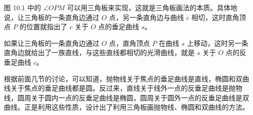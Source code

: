 \begin{minipage}[t]{0.44\textwidth}
  \par\vspace{4pt}{\footnotesize 图\ 10.1}
\end{minipage}

图 10.1 中的 $\angle OPM$ 可以用三角板来实现，这就是三角板画法的本质。具体地说，让三角板的一条直角边通过 $O$ 点，另一条直角边与曲线 $c$ 相切，这时直角顶点 $P$ 的位置就指出了 $c$ 关于 $O$ 点的垂足曲线 $s$。

如果让三角板的一条直角边通过 $O$ 点，直角顶点 $P$ 在曲线 $s$ 上移动，这时另一条直角边就给出了一族直线，与这些直线都相切的光滑曲线，就是 $s$ 关于 $O$ 点的反垂足曲线 $c$。

根据前面几节的讨论，可以知道，抛物线关于焦点的垂足曲线是直线，椭圆和双曲线关于焦点的垂足曲线都是圆。反过来，直线关于线外一点的反垂足曲线是抛物线，圆周关于圆内一点的反垂足曲线是椭圆，圆周关于圆外一点的反垂足曲线是双曲线。正是利用这些性质，设计出了利用三角板画抛物线、椭圆和双曲线的方法。

